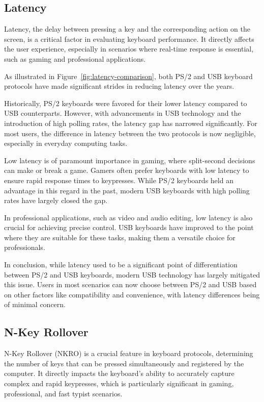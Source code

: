 \subsection{Latency}

Latency, the delay between pressing a key and the corresponding action on the screen, is a critical factor in evaluating keyboard performance. It directly affects the user experience, especially in scenarios where real-time response is essential, such as gaming and professional applications.

As illustrated in Figure~\ref{fig:latency-comparison}, both PS/2 and USB keyboard protocols have made significant strides in reducing latency over the years.

Historically, PS/2 keyboards were favored for their lower latency compared to USB counterparts. However, with advancements in USB technology and the introduction of high polling rates, the latency gap has narrowed significantly. For most users, the difference in latency between the two protocols is now negligible, especially in everyday computing tasks.

Low latency is of paramount importance in gaming, where split-second decisions can make or break a game. Gamers often prefer keyboards with low latency to ensure rapid response times to keypresses. While PS/2 keyboards held an advantage in this regard in the past, modern USB keyboards with high polling rates have largely closed the gap.

In professional applications, such as video and audio editing, low latency is also crucial for achieving precise control. USB keyboards have improved to the point where they are suitable for these tasks, making them a versatile choice for professionals.

In conclusion, while latency used to be a significant point of differentiation between PS/2 and USB keyboards, modern USB technology has largely mitigated this issue. Users in most scenarios can now choose between PS/2 and USB based on other factors like compatibility and convenience, with latency differences being of minimal concern.


\subsection{N-Key Rollover}

N-Key Rollover (NKRO) is a crucial feature in keyboard protocols, determining the number of keys that can be pressed simultaneously and registered by the computer. It directly impacts the keyboard's ability to accurately capture complex and rapid keypresses, which is particularly significant in gaming, professional, and fast typist scenarios.


